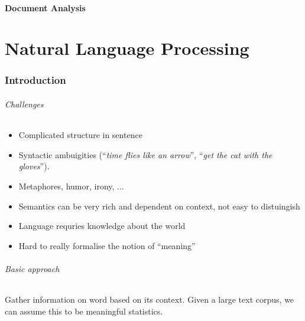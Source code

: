 \documentclass[10pt,twocolumn]{article}
\begin{document}
{\Huge \vspace{1em}~\\ \textbf{Document Analysis}}

\tableofcontents

\part{Natural Language Processing}

\section{Introduction}

\paragraph{\textit{Challenges}}
\begin{itemize}
\item Complicated structure in sentence
\item Syntactic ambuigities (``\textit{time flies like an arrow}'',
  ``\textit{get the cat with the gloves}'').
\item Metaphores, humor, irony, ...
\item Semantics can be very rich and dependent on context, not easy to
  distuingish
\item Language requries knowledge about the world
\item Hard to really formalise the notion of ``meaning''
\end{itemize}

\paragraph{\textit{Basic approach}} Gather information on word based on its
context. Given a large text corpus, we can assume this to be meaningful
statistics.
\end{document}
